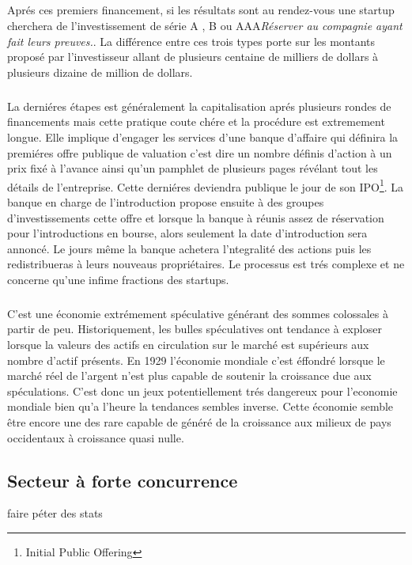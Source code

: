 \documentclass[11pt, a4paper ]{article}
\begin{document}
\begin{spacing}{1.5}
\subparagraph{}
Aprés ces premiers financement, si les résultats sont au rendez-vous une startup cherchera de l'investissement de série A , B ou AAA\emph{Réserver au compagnie ayant fait leurs preuves.}. La différence entre ces trois types porte sur les montants proposé par l'investisseur allant de plusieurs centaine de milliers de dollars à plusieurs dizaine de million de dollars.

\subparagraph{}
La derniéres étapes est généralement la capitalisation aprés plusieurs rondes de financements mais cette pratique coute chére et la procédure est extremement longue. Elle implique d'engager les services d'une banque d'affaire qui définira la premiéres offre publique de valuation c'est dire un nombre définis d'action à un prix fixé à l'avance ainsi qu'un pamphlet de plusieurs pages révélant tout les détails de l'entreprise. Cette derniéres deviendra publique le jour de son IPO\footnote{ Initial Public Offering}. La banque en charge de l'introduction propose ensuite à des groupes d'investissements cette offre et lorsque la banque à réunis assez de réservation pour l'introductions en bourse, alors seulement la date d'introduction sera annoncé.  Le jours même la banque achetera l'ntegralité des actions puis les redistribueras à leurs nouveaus propriétaires. 
Le processus est trés complexe et ne concerne qu'une infime fractions des startups.

\subparagraph{}
C'est une économie extrémement spéculative générant des sommes colossales à partir de peu. Historiquement, les bulles spéculatives ont tendance à exploser lorsque la valeurs des actifs en circulation sur le marché est supérieurs aux nombre d'actif présents. En 1929 l'économie mondiale c'est éffondré lorsque le marché réel de l'argent n'est plus capable de soutenir la croissance due aux spéculations. C'est donc un jeux potentiellement trés dangereux pour l'economie mondiale bien qu'a l'heure la tendances sembles inverse. Cette économie semble être encore une des rare capable de généré de la croissance aux milieux de pays occidentaux à croissance quasi nulle. 


\subsection{Secteur à forte concurrence}

faire péter des stats


\end{spacing}
\end{document}
